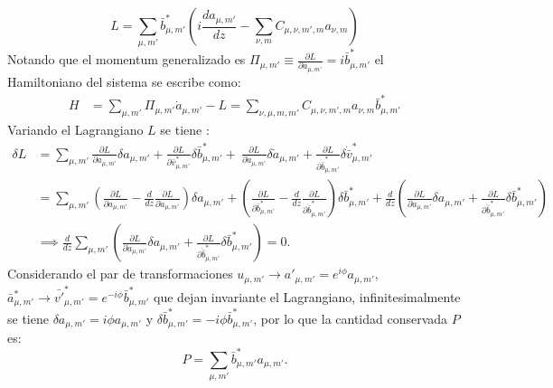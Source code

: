 \begin{equation}
	L = \sum_{\mu, m'} \bar{b}^*_{\mu, m'}\left( i \frac{ d a_{\mu, m'}}{dz}   -
\sum_{\nu, m} C_{\mu, \nu, m', m}  a_{\nu, m}\right)
\end{equation}
Notando que el momentum generalizado es $\Pi_{\mu, m'} \equiv \frac{\partial L}{\partial \dot{a}_{\mu, m'}} = i\bar{b}^*_{\mu, m'}$ el Hamiltoniano del sistema se escribe como:
\begin{align*}
	H &= \sum_{\mu, m'} \Pi_{\mu, m'} \dot{{a}}_{\mu, m'} - L = \sum_{\nu, \mu, m, m'} C_{\mu, \nu, m', m} a_{\nu, m}\bar{b}^*_{\mu, m'}
\end{align*}
Variando el Lagrangiano $L$ se tiene \cite{NHsymmetries}:
\begin{align*}
	\delta L &= \sum_{\mu, m'} \frac{\partial L}{\partial a_{\mu, m'}} \delta a_{\mu, m'} +  \frac{\partial L}{\partial \bar{v}^*_{\mu, m'}} \delta \bar{b}^*_{\mu, m'} + \ \frac{\partial L}{\partial \dot{a}_{\mu, m'}} \delta \dot{a}_{\mu, m'} + \frac{\partial L}{\partial \dot{\bar{b}}^*_{\mu, m'}} \delta \dot{\bar{v}}^*_{\mu, m'}
	\\
	&= \sum_{\mu, m'} \left( \frac{\partial L}{\partial a_{\mu, m'}} - \frac{d}{dz}\frac{\partial L}{\partial \dot{a}_{\mu, m'}} \right)\delta a_{\mu, m'} + \left( \frac{\partial L}{\partial\bar{b}^*_{\mu, m'}} - \frac{d}{dz}\frac{\partial L}{\partial  \dot{\bar{b}}^*_{\mu, m'}} \right)\delta \bar{b}^*_{\mu, m'} + \frac{d}{dz}\left(\frac{\partial L}{\partial \dot{a}_{\mu, m'}}\delta a_{\mu, m'} +  \frac{\partial L}{\partial \dot{\bar{b}}^*_{\mu, m'}}\delta \bar{b}^*_{\mu, m'}\right)
	\\	
	&\implies  \frac{d}{dz} \sum_{\mu, m'}\left(\frac{\partial L}{\partial \dot{a}_{\mu, m'}}\delta a_{\mu, m'} +  \frac{\partial L}{\partial \dot{\bar{b}}^*_{\mu, m'}}\delta \bar{b}^*_{\mu, m'}\right) = 0.
\end{align*}
Considerando el par de transformaciones $u_{\mu, m'}\to a'_{\mu, m'} = e^{i\phi}a_{\mu, m'}$, $\bar{a}^*_{\mu, m'}\to \bar{v'}^*_{\mu, m'} = e^{-i\phi}\bar{b}^*_{\mu, m'}$ que dejan invariante el Lagrangiano, infinitesimalmente se tiene $\delta a_{\mu, m'} = i\phi a_{\mu, m'}$ y $\delta \bar{b}^*_{\mu, m'} = -i\phi \bar{b}^*_{\mu, m'}$, por lo que la cantidad conservada $P$ es:
\begin{equation}
	P = \sum_{\mu, m'} \bar{b}^*_{\mu, m'} a_{\mu, m'}.
\end{equation}



